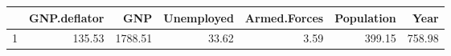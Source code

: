 \documentclass[11pt]{article}
\theoremstyle{definition}
\begin{document}
\begin{itemize}
\begin{itemize}
                \begin{table}[ht]
                    \centering
                    \begin{tabular}{rrrrrrr}
                          \hline
                           & GNP.deflator & GNP & Unemployed & Armed.Forces & Population & Year \\ 
                            \hline
                            1 & 135.53 & 1788.51 & 33.62 & 3.59 & 399.15 & 758.98 \\ 
                               \hline
                           \end{tabular}
                       \end{table}
        \end{itemize}
\end{itemize}
\end{document}

